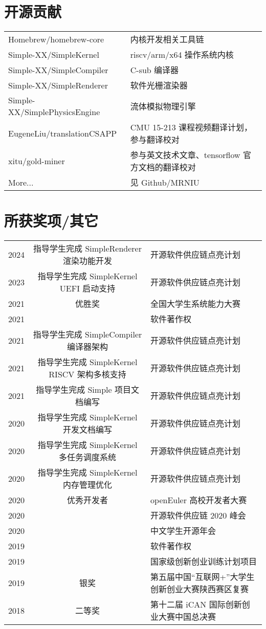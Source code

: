 \documentclass{resume}
\begin{document}
\section{开源贡献}
\begin{tabular}{ll}
  Homebrew/homebrew-core & 内核开发相关工具链 \\
  Simple-XX/SimpleKernel & riscv/arm/x64 操作系统内核 \\
  Simple-XX/SimpleCompiler & C-sub 编译器 \\
  Simple-XX/SimpleRenderer & 软件光栅渲染器 \\
  Simple-XX/SimplePhysicsEngine & 流体模拟物理引擎 \\
  EugeneLiu/translationCSAPP & CMU 15-213 课程视频翻译计划，参与翻译校对 \\
  xitu/gold-miner & 参与英文技术文章、tensorflow 官方文档的翻译校对 \\
  More... & 见 Github/MRNIU
\end{tabular}
\sectionsep

\section{所获奖项/其它} 
\begin{tabular}{rcl}
    2024         & 指导学生完成 SimpleRenderer 渲染功能开发 & 开源软件供应链点亮计划 \\
    2023         & 指导学生完成 SimpleKernel UEFI 启动支持 & 开源软件供应链点亮计划 \\
    2021         & 优胜奖 & 全国大学生系统能力大赛 \\ 
    2021         & & 软件著作权 \\
    2021         & 指导学生完成 SimpleCompiler 编译器架构 & 开源软件供应链点亮计划 \\
    2021         & 指导学生完成 SimpleKernel RISCV 架构多核支持 & 开源软件供应链点亮计划 \\
    2021         & 指导学生完成 Simple 项目文档编写 & 开源软件供应链点亮计划 \\
    2020         & 指导学生完成 SimpleKernel 开发文档编写 & 开源软件供应链点亮计划 \\
    2020         & 指导学生完成 SimpleKernel 多任务调度系统 & 开源软件供应链点亮计划 \\
    2020         & 指导学生完成 SimpleKernel 内存管理优化 & 开源软件供应链点亮计划 \\
    2020         & 优秀开发者 & openEuler 高校开发者大赛 \\ 
    2020         & & 开源软件供应链 2020 峰会 \\
    2020         & & 中文学生开源年会 \\
    2019         & & 软件著作权 \\
    2019         & & 国家级创新创业训练计划项目 \\
    2019         & 银奖    & 第五届中国“互联网+”大学生创新创业大赛陕西赛区复赛 \\
    2018	       & 二等奖  & 第十二届 iCAN 国际创新创业大赛中国总决赛 \\
\end{tabular}
\sectionsep
\end{document}
